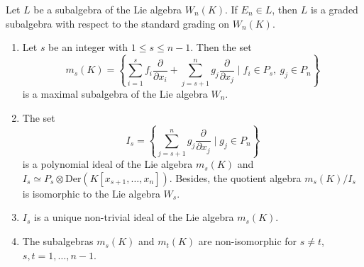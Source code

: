 \documentclass[10pt,a4paper]{amsart}
\begin{document}
\begin{lemma} \label{lm:grading}
	Let $L$ be a subalgebra of the Lie algebra $W_n(K)$. If $E_n \in L$, then $L$ is a graded subalgebra with respect to the standard grading on $W_n(K)$.
\end{lemma}

	\begin{theorem}\label{th_1}
	\quad
\begin{enumerate}
	\item
	Let $s$ be an integer with $1\le s\le n-1$.
	Then the set
	\[
	m_s(K)=\left\{
	\sum_{i=1}^s f_i\frac{\partial}{\partial x_i}
	+\sum_{j=s+1}^n g_j\frac{\partial}{\partial x_j}
	\mid f_i\in P_s,\ g_j\in P_n
	\right\}
	\]
	is a maximal subalgebra of the Lie algebra $W_n$.
	
	\item
	The set
	\[
	I_s=\left\{\sum_{j=s+1}^n g_j\frac{\partial}{\partial x_j}\mid g_j\in P_n\right\}
	\]
	is a polynomial ideal of the Lie algebra $m_s(K)$ and
	$I_s\simeq P_s\otimes \mathrm{Der}(K[x_{s+1},\ldots,x_n])$.
	Besides, the quotient algebra $m_s(K)/I_s$ is isomorphic to the Lie algebra $W_s$.
	
	\item $I_s$ is a unique non-trivial ideal of the Lie algebra  $m_s(K)$.
	
	\item
	The subalgebras $m_s(K)$ and $m_t(K)$ are non-isomorphic for $s\ne t$,
	$s,t=1,\ldots,n-1$.
\end{enumerate}\end{theorem}
\end{document}
